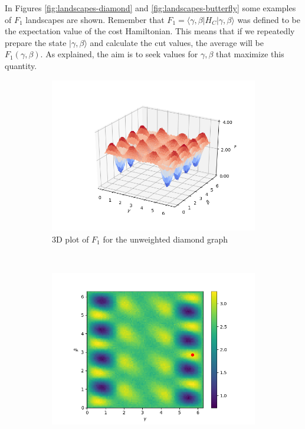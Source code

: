 In Figures \ref{fig:landscapes-diamond} and \ref{fig:landscapes-butterfly} some examples of $F_1$ landscapes are shown. Remember that $F_1 = \langle \gamma, \beta | H_C | \gamma, \beta \rangle$ was defined to be the expectation value of the cost Hamiltonian. This means that if we repeatedly prepare the state $|\gamma,\beta\rangle$ and calculate the cut values, the average will be $F_1(\gamma,\beta)$. As explained, the aim is to seek values for $\gamma, \beta$ that maximize this quantity.
\begin{figure}[H]
	\begin{subfigure}[t]{0.42\textwidth}
		\centering
		\includegraphics[width=\textwidth]{figures/landscape_new/diamond_3D.png}
		\caption{3D plot of $F_1$ for the unweighted diamond graph}
		\label{subfig:Diamond3D}
	\end{subfigure}%
	~ 
	\begin{subfigure}[t]{0.42\textwidth}
		\centering
		\includegraphics[width=\textwidth]{figures/landscape_new/diamond_imshow.png}

\end{subfigure}
\end{figure}
